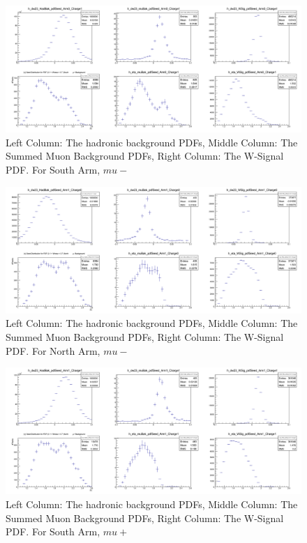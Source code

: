 \begin{figure}
  \centering
  \includegraphics[width=\linewidth]{././figures/c_dw23_Eta_PDF_Arm0_Charge1.png}
  \caption{
    Left Column: The hadronic background PDFs, Middle Column: The Summed Muon
    Background PDFs, Right Column: The W-Signal PDF. For South Arm, $mu-$
  }
  \label{fig:c_dw23_Eta_PDF_Arm0_Charge1}
\end{figure}

\begin{figure}
  \centering
  \includegraphics[width=\linewidth]{././figures/c_dw23_Eta_PDF_Arm1_Charge0.png}
  \caption{
    Left Column: The hadronic background PDFs, Middle Column: The Summed Muon
    Background PDFs, Right Column: The W-Signal PDF. For North Arm, $mu-$
  }
  \label{fig:c_dw23_Eta_PDF_Arm1_Charge0}
\end{figure}

\begin{figure}
  \centering
  \includegraphics[width=\linewidth]{././figures/c_dw23_Eta_PDF_Arm1_Charge1.png}
  \caption{
    Left Column: The hadronic background PDFs, Middle Column: The Summed Muon
    Background PDFs, Right Column: The W-Signal PDF. For South Arm, $mu+$
  }
  \label{fig:c_dw23_Eta_PDF_Arm1_Charge1}
\end{figure}

